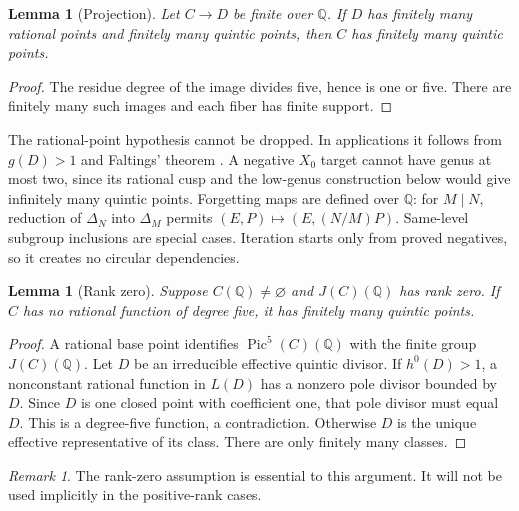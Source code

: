 \documentclass[11pt]{article}
\newcommand{\Q}{\mathbb Q}
\newcommand{\Pic}{\operatorname{Pic}}
\newtheorem{lemma}[theorem]{Lemma}
\theoremstyle{remark}\newtheorem{remark}[theorem]{Remark}
\begin{document}
\begin{lemma}[Projection]
Let $C\to D$ be finite over $\Q$. If $D$ has finitely many rational
points and finitely many quintic points, then $C$ has finitely many
quintic points.
\end{lemma}
\begin{proof}
The residue degree of the image divides five, hence is one or five.
There are finitely many such images and each fiber has finite support.
\end{proof}
The rational-point hypothesis cannot be dropped. In applications it
follows from $g(D)>1$ and Faltings' theorem \cite{Faltings}.
A negative $X_0$ target cannot
have genus at most two, since its rational cusp and the low-genus
construction below would give infinitely many quintic points.
Forgetting maps are defined
over $\Q$: for $M\mid N$, reduction of $\Delta_N$ into $\Delta_M$
permits $(E,P)\mapsto(E,(N/M)P)$. Same-level subgroup inclusions are
special cases. Iteration starts only from proved negatives, so it creates
no circular dependencies.

\begin{lemma}[Rank zero]
Suppose $C(\Q)\ne\varnothing$ and $J(C)(\Q)$ has rank zero.
If $C$ has no rational function of degree five, it has finitely many
quintic points.
\end{lemma}
\begin{proof}
A rational base point identifies $\Pic^5(C)(\Q)$ with the finite group
$J(C)(\Q)$. Let $D$ be an irreducible effective quintic divisor. If
$h^0(D)>1$, a nonconstant rational function in $L(D)$ has a nonzero pole
divisor bounded by $D$. Since $D$ is one closed point with coefficient
one, that pole divisor must equal $D$. This is a degree-five function,
a contradiction. Otherwise $D$ is the unique effective representative
of its class. There are only finitely many classes.
\end{proof}
\begin{remark}
The rank-zero assumption is essential to this argument. It will not be
used implicitly in the positive-rank cases.
\end{remark}
\end{document}
